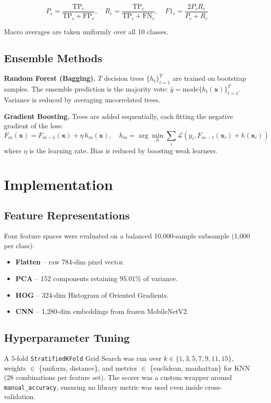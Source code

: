 \documentclass[10pt,twocolumn]{article}
\begin{document}
\begin{equation}
P_c = \frac{\text{TP}_c}{\text{TP}_c+\text{FP}_c},\quad
R_c = \frac{\text{TP}_c}{\text{TP}_c+\text{FN}_c},\quad
F1_c = \frac{2P_cR_c}{P_c+R_c}
\end{equation}

Macro averages are taken uniformly over all 10 classes.

\subsection{Ensemble Methods}

\textbf{Random Forest (Bagging).}
$T$ decision trees $\{h_t\}_{t=1}^T$ are trained on bootstrap samples.
The ensemble prediction is the majority vote:
$\hat{y} = \text{mode}\{h_t(\mathbf{x})\}_{t=1}^T$.
Variance is reduced by averaging uncorrelated trees.

\textbf{Gradient Boosting.}
Trees are added sequentially, each fitting the negative gradient of the loss:
\begin{equation}
F_m(\mathbf{x}) = F_{m-1}(\mathbf{x}) + \eta\, h_m(\mathbf{x}),\quad
h_m = \arg\min_h \sum_i \mathcal{L}(y_i, F_{m-1}(\mathbf{x}_i) + h(\mathbf{x}_i))
\end{equation}
where $\eta$ is the learning rate.  Bias is reduced by boosting weak learners.

\section{Implementation}

\subsection{Feature Representations}
Four feature spaces were evaluated on a balanced 10{,}000-sample subsample
(1{,}000 per class):
\begin{itemize}[noitemsep,topsep=2pt]
  \item \textbf{Flatten} – raw 784-dim pixel vector.
  \item \textbf{PCA} – 152 components retaining 95.01\% of variance.
  \item \textbf{HOG} – 324-dim Histogram of Oriented Gradients.
  \item \textbf{CNN} – 1{,}280-dim embeddings from frozen MobileNetV2.
\end{itemize}

\subsection{Hyperparameter Tuning}
A 5-fold \texttt{StratifiedKFold} Grid Search was run over
$k \in \{1,3,5,7,9,11,15\}$, weights $\in$ \{uniform, distance\},
and metrics $\in$ \{euclidean, manhattan\} for KNN (28 combinations per feature set).
The scorer was a custom wrapper around \texttt{manual\_accuracy}, ensuring no
library metric was used even inside cross-validation.
\end{document}
